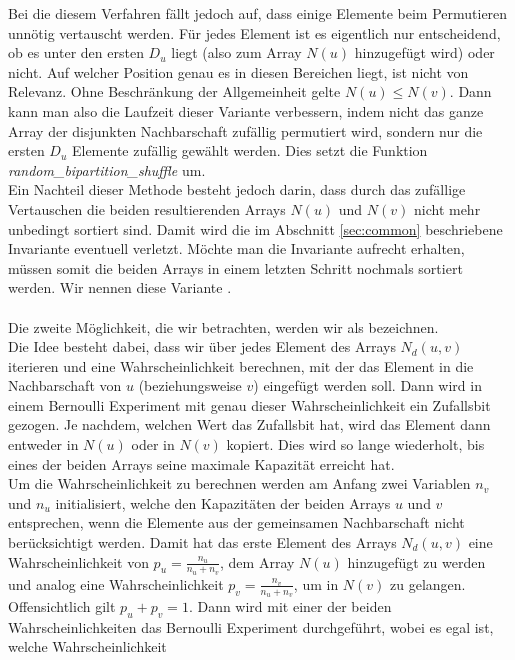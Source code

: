 Bei die diesem Verfahren fällt  jedoch auf, dass einige Elemente beim Permutieren unnötig vertauscht werden.
Für jedes Element ist es eigentlich nur entscheidend, ob es unter den ersten $D_{u}$  liegt (also zum Array
$N(u)$ hinzugefügt wird) oder nicht. Auf welcher Position genau es in 
diesen Bereichen liegt, ist nicht von Relevanz. Ohne Beschränkung der Allgemeinheit gelte 
$N(u) \le N(v)$. Dann kann man
also die Laufzeit dieser Variante verbessern, indem nicht das ganze Array der disjunkten Nachbarschaft zufällig permutiert 
wird, sondern nur die ersten $D_{u}$  Elemente zufällig gewählt werden.
 Dies setzt die Funktion 
\textit{random\_bipartition\_shuffle} um.
\\
Ein Nachteil dieser Methode besteht jedoch darin, dass durch das zufällige Vertauschen die beiden resultierenden Arrays
$N(u)$ und $N(v)$ nicht mehr unbedingt sortiert sind. Damit wird die im Abschnitt \ref{sec:common} beschriebene
Invariante eventuell verletzt. Möchte man die Invariante aufrecht erhalten, müssen somit die beiden Arrays
in einem letzten Schritt nochmals sortiert werden.
Wir nennen diese Variante \perm.
\\
\\
Die zweite Möglichkeit, die wir betrachten, werden wir als \distr{} bezeichnen.
\\
Die Idee besteht dabei, dass wir über jedes Element des Arrays $N_{d}(u,v)$ iterieren und eine Wahrscheinlichkeit
berechnen, mit
der das Element in die Nachbarschaft von $u$ (beziehungsweise $v$) eingefügt werden soll. Dann wird in einem 
Bernoulli Experiment mit genau dieser Wahrscheinlichkeit ein Zufallsbit gezogen. Je nachdem, welchen
Wert das Zufallsbit hat, wird das Element dann entweder in $N(u)$ oder in $N(v)$ kopiert. Dies wird so lange
wiederholt, bis eines der beiden Arrays seine maximale Kapazität erreicht hat. 
\\
Um die Wahrscheinlichkeit zu berechnen werden am Anfang zwei Variablen $n_v$ und $n_u$ initialisiert, 
welche den Kapazitäten der beiden Arrays $u$ und $v$ entsprechen, wenn die Elemente aus der 
gemeinsamen Nachbarschaft nicht berücksichtigt werden. 
Damit hat das erste Element des Arrays $N_{d}(u,v)$ eine Wahrscheinlichkeit von $p_u = \frac{n_u}{n_u+n_v}$, dem
Array $N(u)$ hinzugefügt zu werden und analog eine Wahrscheinlichkeit $p_v = \frac{n_v}{n_u+n_v}$, um
in $N(v)$ zu gelangen. Offensichtlich gilt $p_u + p_v = 1$. Dann wird mit einer der beiden
Wahrscheinlichkeiten das Bernoulli Experiment durchgeführt, wobei es egal ist, welche Wahrscheinlichkeit
